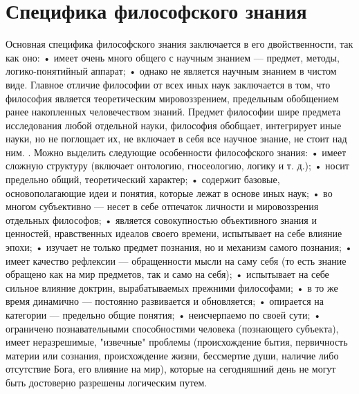 \documentclass[12pt]{article}
\begin{document}
\section{Специфика философского знания}
Основная специфика философского знания заключается в его двойственности, так как оно:
• имеет очень много общего с научным знанием — предмет, методы, логико-понятийный аппарат;
• однако не является научным знанием в чистом виде.
Главное отличие философии от всех иных наук заключается в том, что философия является теоретическим
мировоззрением, предельным обобщением ранее накопленных человечеством знаний.
Предмет философии шире предмета исследования любой отдельной науки, философия обобщает, интегрирует
иные науки, но не поглощает их, не включает в себя все научное знание, не стоит над ним.
. Можно выделить следующие особенности философского знания:
• имеет сложную структуру (включает онтологию, гносеологию, логику и т. д.);
• носит предельно общий, теоретический характер;
• содержит базовые, основополагающие идеи и понятия, которые лежат в основе иных наук;
• во многом субъективно — несет в себе отпечаток личности и мировоззрения отдельных философов;
•  является  совокупностью  объективного  знания  и  ценностей,  нравственных  идеалов  своего  времени,
испытывает на себе влияние эпохи;
• изучает не только предмет познания, но и механизм самого познания;
•  имеет  качество  рефлексии  —  обращенности  мысли  на  саму  себя  (то  есть  знание  обращено  как  на  мир
предметов, так и само на себя);
• испытывает на себе сильное влияние доктрин, вырабатываемых прежними философами;
• в то же время динамично — постоянно развивается и обновляется;
• опирается на категории — предельно общие понятия;
• неисчерпаемо по своей сути;
•  ограничено  познавательными  способностями  человека  (познающего  субъекта),  имеет  неразрешимые,
"извечные"  проблемы  (происхождение  бытия,  первичность  материи  или  сознания,  происхождение  жизни,
бессмертие души, наличие либо отсутствие Бога, его влияние на мир), которые на сегодняшний день не могут
быть достоверно разрешены логическим путем.


\newpage
\end{document}
